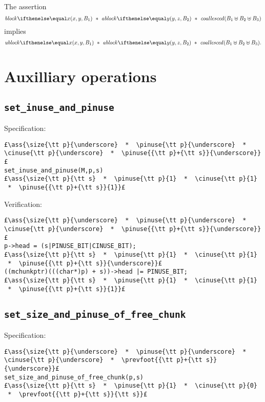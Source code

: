 \documentclass[10pt,twoside]{report}
\makeatletter
\newcommand{\ml}[2][t]{\mbox{\mdseries\begin{tabular}[#1]{@{}L@{}}#2\end{tabular}}}
\newcommand{\ass}[1]{\ensuremath{{\color{blue}\left\{\ml[c]{#1}\right\}}}}
\makeatother
\begin{document}
\begin{lemma}\label{lem:coallesced} The assertion
\[
\block{x}{y}{B_1}  *  \ablock{y}{z}{B_2}  *  \coallesced{B_1\uplus B_2 \uplus B_3}\]
implies
\[
\ublock{x}{y}{B_1}  *  \ablock{y}{z}{B_2}  *  \coallesced{B_1\uplus B_2 \uplus B_3}.
\]
\end{lemma}

\chapter{Auxilliary operations}\label{chap:smallbins_and_trees}

\section{\tt set\_inuse\_and\_pinuse}

Specification:
\begin{lstlisting}
£\ass{\size{\tt p}{\underscore}  *  \pinuse{\tt p}{\underscore}  *  \cinuse{\tt p}{\underscore}  *  \pinuse{{\tt p}+{\tt s}}{\underscore}}£
set_inuse_and_pinuse(M,p,s)
£\ass{\size{\tt p}{\tt s}  *  \pinuse{\tt p}{1}  *  \cinuse{\tt p}{1}  *  \pinuse{{\tt p}+{\tt s}}{1}}£
\end{lstlisting}

\noindent Verification:
\begin{lstlisting}
£\ass{\size{\tt p}{\underscore}  *  \pinuse{\tt p}{\underscore}  *  \cinuse{\tt p}{\underscore}  *  \pinuse{{\tt p}+{\tt s}}{\underscore}}£
p->head = (s|PINUSE_BIT|CINUSE_BIT);
£\ass{\size{\tt p}{\tt s}  *  \pinuse{\tt p}{1}  *  \cinuse{\tt p}{1}  *  \pinuse{{\tt p}+{\tt s}}{\underscore}}£
((mchunkptr)(((char*)p) + s))->head |= PINUSE_BIT;
£\ass{\size{\tt p}{\tt s}  *  \pinuse{\tt p}{1}  *  \cinuse{\tt p}{1}  *  \pinuse{{\tt p}+{\tt s}}{1}}£
\end{lstlisting}

\section{\tt set\_size\_and\_pinuse\_of\_free\_chunk}

Specification:
\begin{lstlisting}
£\ass{\size{\tt p}{\underscore}  *  \pinuse{\tt p}{\underscore}  *  \cinuse{\tt p}{\underscore}  *  \prevfoot{{\tt p}+{\tt s}}{\underscore}}£
set_size_and_pinuse_of_free_chunk(p,s)
£\ass{\size{\tt p}{\tt s}  *  \pinuse{\tt p}{1}  *  \cinuse{\tt p}{0}  *  \prevfoot{{\tt p}+{\tt s}}{\tt s}}£
\end{lstlisting}
\end{document}

